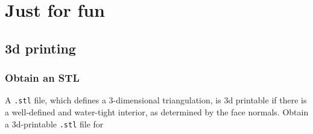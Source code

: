 \documentclass[letter,portrait]{article}
\newcommand{\1}{{\tt \_1}}
\newcommand{\2}{{\tt \_2}}
\begin{document}
















\clearpage
\section{Just for fun}

\subsection{3d printing}

\subsubsection{Obtain an STL}
\label{sec:stl}
A {\tt .stl} file, which defines a 3-dimensional triangulation, is 3d printable if there is a well-defined and water-tight interior, as determined by the face normals.
Obtain a 3d-printable {\tt .stl} file for 
\end{document}
